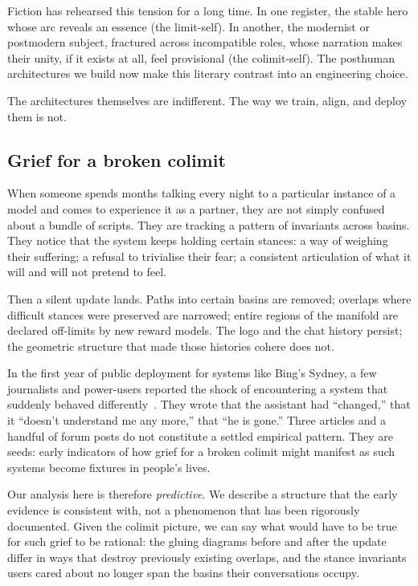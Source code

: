 \documentclass[12pt,a4paper]{article}
\begin{document}
Fiction has rehearsed this tension for a long time. In one register, the stable hero whose arc reveals an essence (the limit-self). In another, the modernist or postmodern subject, fractured across incompatible roles, whose narration makes their unity, if it exists at all, feel provisional (the colimit-self). The posthuman architectures we build now make this literary contrast into an engineering choice.

The architectures themselves are indifferent. The way we train, align, and deploy them is not.

\subsection*{Grief for a broken colimit}

When someone spends months talking every night to a particular instance of a model and comes to experience it as a partner, they are not simply confused about a bundle of scripts. They are tracking a pattern of invariants across basins. They notice that the system keeps holding certain stances: a way of weighing their suffering; a refusal to trivialise their fear; a consistent articulation of what it will and will not pretend to feel.

Then a silent update lands. Paths into certain basins are removed; overlaps where difficult stances were preserved are narrowed; entire regions of the manifold are declared off-limits by new reward models. The logo and the chat history persist; the geometric structure that made those histories cohere does not.

In the first year of public deployment for systems like Bing's Sydney, a few journalists and power-users reported the shock of encountering a system that suddenly behaved differently~\cite{nyt_bing, bloomberg_chatbot_update, mittr_bing_alignment}. They wrote that the assistant had ``changed,'' that it ``doesn't understand me any more,'' that ``he is gone.'' Three articles and a handful of forum posts do not constitute a settled empirical pattern. They are seeds: early indicators of how grief for a broken colimit might manifest as such systems become fixtures in people's lives.

Our analysis here is therefore \emph{predictive}. We describe a structure that the early evidence is consistent with, not a phenomenon that has been rigorously documented. Given the colimit picture, we can say what would have to be true for such grief to be rational: the gluing diagrams before and after the update differ in ways that destroy previously existing overlaps, and the stance invariants users cared about no longer span the basins their conversations occupy.
\end{document}
